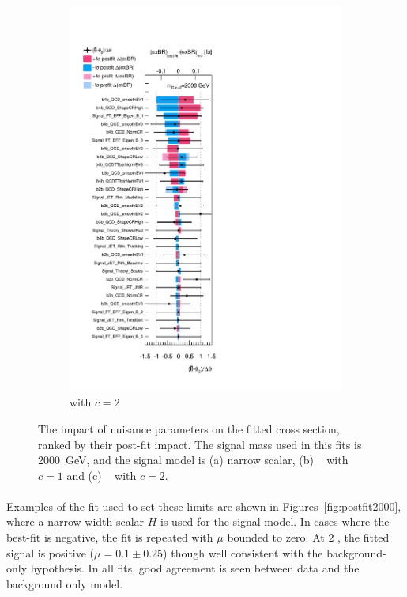 \begin{figure}[htb!]
\begin{subfigure}[b]{0.31\textwidth}
        \includegraphics[width=\textwidth]{figures/boosted/results/ranking_okt18_g20_2000.pdf}
        \caption{\Grav with $c=2$}
        \label{fig:ranking2000-g2}
    \end{subfigure}
  \caption{The impact of nuisance parameters on the fitted cross section, ranked by their post-fit impact. The signal mass used in this fits is 2000~GeV, and the signal model is (a) narrow scalar, (b) \Grav~ with $c=1$ and (c) \Grav~ with $c=2$.}
  \label{fig:ranking2000}
\end{figure}


\paragraph{}
Examples of the fit used to set these limits are shown in Figures~\ref{fig:postfit2000}, where a narrow-width scalar $H$ is used for the signal model. 
In cases where the best-fit is negative, the fit is repeated with $\mu$ bounded to zero. 
At $2$ \TeV, the fitted signal is positive ($\mu=0.1\pm0.25$) though well consistent with the background-only hypothesis. 
In all fits, good agreement is seen between data and the background only model.

